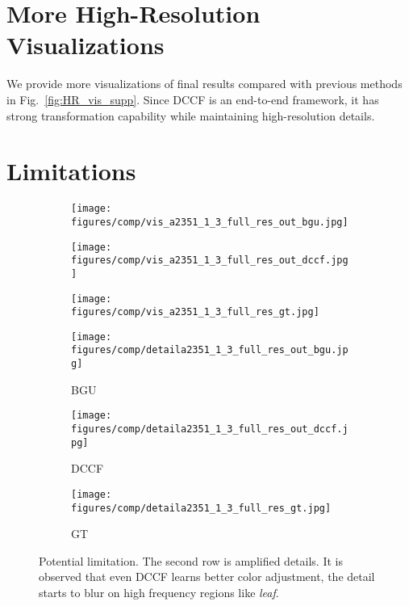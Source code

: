 \documentclass[runningheads]{llncs}
\begin{document}
\section{More High-Resolution Visualizations}
\label{sec:high-res-vis}
We provide more visualizations of final results compared with previous methods in Fig.~\ref{fig:HR_vis_supp}.
Since DCCF is an end-to-end framework, it has strong transformation capability while maintaining high-resolution details.


\section{Limitations}
\label{sec:limitation}

\begin{figure}[htbp]
  \centering
  
  \begin{subfigure}[t]{0.3\linewidth}
  \centering
  \texttt{[image: figures/comp/vis\_a2351\_1\_3\_full\_res\_out\_bgu.jpg]}
\end{subfigure}
  \begin{subfigure}[t]{0.3\linewidth}
  \centering
  \texttt{[image: figures/comp/vis\_a2351\_1\_3\_full\_res\_out\_dccf.jpg]}
\end{subfigure}
  \begin{subfigure}[t]{0.3\linewidth}
  \centering
  \texttt{[image: figures/comp/vis\_a2351\_1\_3\_full\_res\_gt.jpg]}
\end{subfigure}


  \begin{subfigure}[t]{0.3\linewidth}
    \centering
    \texttt{[image: figures/comp/detaila2351\_1\_3\_full\_res\_out\_bgu.jpg]}
    \caption{BGU~\cite{chen2016bilateral}}
    \end{subfigure}
    \begin{subfigure}[t]{0.3\linewidth}
    \centering
    \texttt{[image: figures/comp/detaila2351\_1\_3\_full\_res\_out\_dccf.jpg]}
    \caption{DCCF}
    \end{subfigure}
    \begin{subfigure}[t]{0.3\linewidth}
    \centering
    \texttt{[image: figures/comp/detaila2351\_1\_3\_full\_res\_gt.jpg]}
    \caption{GT}
    \end{subfigure}
  
  \caption{Potential limitation. The second row is amplified details. It is observed that even DCCF learns better color adjustment, the detail starts to blur on high frequency regions like \textit{leaf}.}
  
  \label{fig:limitation}
  \end{figure}
\end{document}
